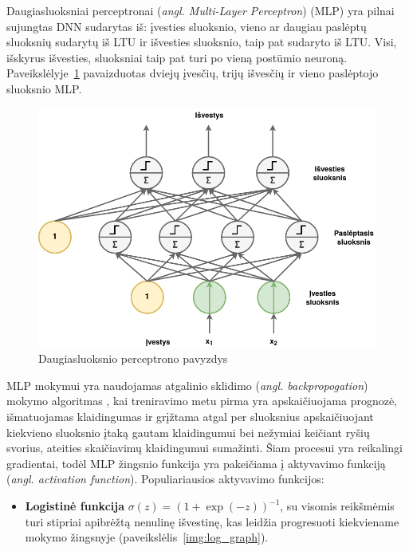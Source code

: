 \documentclass{VUMIFPSbakalaurinis}
\begin{document}
{
	Daugiasluoksniai perceptronai (\textit{angl. Multi-Layer Perceptron}) (MLP) yra pilnai sujungtas DNN sudarytas iš: įvesties sluoksnio, vieno ar daugiau paslėptų sluoksnių sudarytų iš LTU ir išvesties sluoksnio, taip pat sudaryto iš LTU. Visi, išskyrus išvesties, sluoksniai taip pat turi po vieną postūmio neuroną. Paveikslėlyje~\ref{img:mlp} pavaizduotas dviejų įvesčių, trijų išvesčių ir vieno paslėptojo sluoksnio MLP.
	
	\begin{figure}[H]
		\centering
		\includegraphics[scale=0.5]{img/mlp}
		\caption{Daugiasluoksnio perceptrono pavyzdys}
		\label{img:mlp}
	\end{figure} 
	
	MLP mokymui yra naudojamas atgalinio sklidimo (\textit{angl. backpropogation}) mokymo algoritmas \cite{rumelhart1985learning}, kai treniravimo metu pirma yra apskaičiuojama prognozė, išmatuojamas klaidingumas ir grįžtama atgal per sluoksnius apskaičiuojant kiekvieno sluoksnio įtaką gautam klaidingumui bei nežymiai keičiant ryšių svorius, ateities skaičiavimų klaidingumui sumažinti. Šiam procesui yra reikalingi gradientai, todėl MLP žingsnio funkcija yra pakeičiama į aktyvavimo funkciją (\textit{angl. activation function}). Populiariausios aktyvavimo funkcijos:
	
	\begin{itemize}
		\item \textbf{Logistinė funkcija} \(\sigma(z) = (1 + \exp(-z))^{-1}\), su visomis reikšmėmis turi stipriai apibrėžtą nenulinę išvestinę, kas leidžia progresuoti kiekviename mokymo žingsnyje (paveikslėlis~\ref{img:log_graph}).
		

\end{itemize}}
\end{document}
